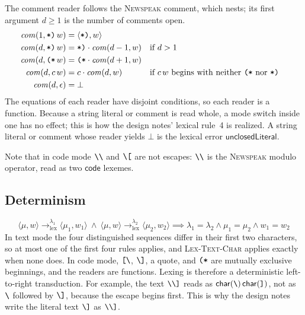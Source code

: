 \documentclass[11pt]{article}
\numberwithin{equation}{section}
\newcommand{\NS}{\textsc{Newspeak}}
\newcommand{\kw}[1]{\ensuremath{\mathsf{#1}}}
\newcommand{\str}[1]{\ensuremath{\text{\texttt{#1}}}}
\newcommand{\bs}{\textbackslash}
\newcommand{\Open}{\str{[\bs}}
\newcommand{\Close}{\str{\bs]}}
\newcommand{\lexto}{\longrightarrow_{\mathrm{lex}}}
\newcommand{\rulelabel}[1]{\textsc{#1}}
\begin{document}
The comment reader follows the \NS{} comment, which nests; its first
argument $d \ge 1$ is the number of comments open.
\begin{equation}\label{eq:comment-reader}
\begin{aligned}
\mathit{com}(1, \str{*)}\,w) &= \langle \str{*)}, w \rangle \\
\mathit{com}(d, \str{*)}\,w) &= \str{*)} \cdot \mathit{com}(d-1, w)
  && \text{if } d > 1 \\
\mathit{com}(d, \str{(*}\,w) &= \str{(*} \cdot \mathit{com}(d+1, w) \\
\mathit{com}(d, c\,w) &= c \cdot \mathit{com}(d, w)
  && \text{if } c\,w \text{ begins with neither } \str{(*} \text{ nor } \str{*)} \\
\mathit{com}(d, \epsilon) &= \bot
\end{aligned}
\end{equation}
The equations of each reader have disjoint conditions, so each reader is a
function.  Because a string literal or comment is read whole, a mode switch
inside one has no effect; this is how the design notes' lexical rule~4 is
realized.  A string literal or comment whose reader yields $\bot$ is the
lexical error $\kw{unclosedLiteral}$.

Note that in code mode $\str{\bs\bs}$ and $\str{\bs[}$ are not escapes:
$\str{\bs\bs}$ is the \NS{} modulo operator, read as two
$\kw{code}$ lexemes.

\subsection{Determinism}

\begin{equation}\label{eq:lex-determinism}
\langle \mu, w \rangle \lexto^{\lambda_1} \langle \mu_1, w_1 \rangle
\ \wedge\
\langle \mu, w \rangle \lexto^{\lambda_2} \langle \mu_2, w_2 \rangle
\implies \lambda_1 = \lambda_2 \wedge \mu_1 = \mu_2 \wedge w_1 = w_2
\end{equation}
In text mode the four distinguished sequences differ in their first two
characters, so at most one of the first four rules applies, and
\rulelabel{Lex-Text-Char} applies exactly when none does.  In code mode,
$\Open$, $\Close$, a quote, and $\str{(*}$ are mutually exclusive
beginnings, and the readers are functions.  Lexing is therefore a
deterministic left-to-right transduction.  For example, the text
$\str{\bs\bs]}$ reads as $\kw{char}(\str{\bs})\,\kw{char}(\str{]})$, not as
$\str{\bs}$ followed by $\Close$, because the escape begins first.  This is
why the design notes write the literal text $\Close$ as $\str{\bs\bs]}$.
\end{document}
